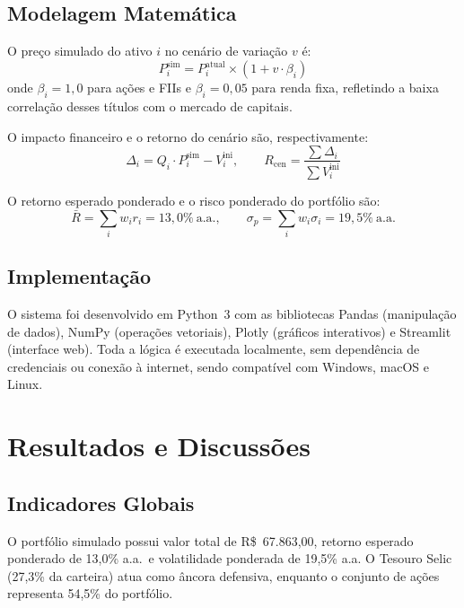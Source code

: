\documentclass[12pt]{article}
\begin{document}
\subsection{Modelagem Matemática}

O preço simulado do ativo $i$ no cenário de variação $v$ é:
\begin{equation}
  P_i^{\text{sim}} = P_i^{\text{atual}} \times (1 + v \cdot \beta_i)
  \label{eq:preco}
\end{equation}
onde $\beta_i = 1{,}0$ para ações e FIIs e $\beta_i = 0{,}05$ para renda fixa,
refletindo a baixa correlação desses títulos com o mercado de capitais.

O impacto financeiro e o retorno do cenário são, respectivamente:
\begin{equation}
  \Delta_i = Q_i \!\cdot\! P_i^{\text{sim}} - V_i^{\text{ini}},
  \qquad
  R_{\text{cen}} = \frac{\sum \Delta_i}{\sum V_i^{\text{ini}}}
  \label{eq:impacto}
\end{equation}

O retorno esperado ponderado e o risco ponderado do portfólio são:
\begin{equation}
  \bar{R} = \sum_{i} w_i r_i = 13{,}0\%~\text{a.a.},
  \qquad
  \sigma_p = \sum_{i} w_i \sigma_i = 19{,}5\%~\text{a.a.}
  \label{eq:ponderados}
\end{equation}

\subsection{Implementação}

O sistema foi desenvolvido em Python~3 com as bibliotecas Pandas \cite{mckinney2010}
(manipulação de dados), NumPy (operações vetoriais), Plotly (gráficos interativos) e
Streamlit (interface web). Toda a lógica é executada localmente, sem dependência de
credenciais ou conexão à internet, sendo compatível com Windows, macOS e Linux.

\section{Resultados e Discussões}

\subsection{Indicadores Globais}

O portfólio simulado possui valor total de R\$~67.863,00, retorno esperado ponderado
de 13,0\% a.a.\ e volatilidade ponderada de 19,5\% a.a. O Tesouro Selic (27,3\% da
carteira) atua como âncora defensiva, enquanto o conjunto de ações representa 54,5\%
do portfólio.
\end{document}

